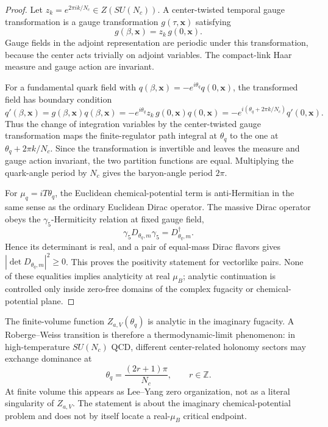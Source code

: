 \begin{proof}
Let \(z_k=e^{2\pi i k/N_c}\in Z(SU(N_c))\).  A center-twisted temporal gauge
transformation is a gauge transformation \(g(\tau,\mathbf x)\) satisfying
\[
  g(\beta,\mathbf x)=z_k\,g(0,\mathbf x).
\]
Gauge fields in the adjoint representation are periodic under this
transformation, because the center acts trivially on adjoint variables.  The
compact-link Haar measure and gauge action are invariant.

For a fundamental quark field with
\(q(\beta,\mathbf x)=-e^{i\theta_q}q(0,\mathbf x)\), the transformed field
has boundary condition
\[
  q'(\beta,\mathbf x)
  =
  g(\beta,\mathbf x)q(\beta,\mathbf x)
  =
  -e^{i\theta_q}z_k\,g(0,\mathbf x)q(0,\mathbf x)
  =
  -e^{i(\theta_q+2\pi k/N_c)}q'(0,\mathbf x).
\]
Thus the change of integration variables by the center-twisted gauge
transformation maps the finite-regulator path integral at \(\theta_q\) to
the one at \(\theta_q+2\pi k/N_c\).  Since the transformation is invertible
and leaves the measure and gauge action invariant, the two partition
functions are equal.  Multiplying the quark-angle period by \(N_c\) gives
the baryon-angle period \(2\pi\).

For \(\mu_q=iT\theta_q\), the Euclidean chemical-potential term is
anti-Hermitian in the same sense as the ordinary Euclidean Dirac operator.
The massive Dirac operator obeys the \(\gamma_5\)-Hermiticity relation at
fixed gauge field,
\[
  \gamma_5D_{\theta_q,m}\gamma_5=D_{\theta_q,m}^{\dagger}.
\]
Hence its determinant is real, and a pair of equal-mass Dirac flavors gives
\(|\det D_{\theta_q,m}|^2\ge0\).  This proves the positivity statement for
vectorlike pairs.  None of these equalities implies analyticity at real
\(\mu_B\); analytic continuation is controlled only inside zero-free
domains of the complex fugacity or chemical-potential plane.
\end{proof}

\begin{remark}
\label{rem:qcd-roberge-weiss-lines}
The finite-volume function \(Z_{a,V}(\theta_q)\) is analytic in the imaginary
fugacity.  A Roberge--Weiss transition is therefore a thermodynamic-limit
phenomenon: in high-temperature \(SU(N_c)\) QCD, different center-related
holonomy sectors may exchange dominance at
\[
  \theta_q=\frac{(2r+1)\pi}{N_c},\qquad r\in\mathbb Z .
\]
At finite volume this appears as Lee--Yang zero organization, not as a
literal singularity of \(Z_{a,V}\).  The statement is about the imaginary
chemical-potential problem and does not by itself locate a real-\(\mu_B\)
critical endpoint.
\end{remark}

